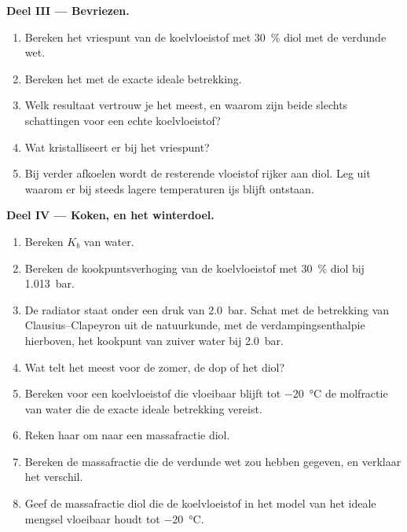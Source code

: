 \begin{problem}
\medskip
\noindent\textbf{Deel III --- Bevriezen.}
\begin{enumerate}[resume]
  \item Bereken het vriespunt van de koelvloeistof met \qty{30}{\percent} diol met de
        verdunde wet.
  \item Bereken het met de exacte ideale betrekking.
  \item Welk resultaat vertrouw je het meest, en waarom zijn beide slechts schattingen voor een
        echte koelvloeistof?
  \item Wat kristalliseert er bij het vriespunt?
  \item Bij verder afkoelen wordt de resterende vloeistof rijker aan diol. Leg uit
        waarom er bij steeds lagere temperaturen ijs blijft ontstaan.
\end{enumerate}

\medskip
\noindent\textbf{Deel IV --- Koken, en het winterdoel.}
\begin{enumerate}[resume]
  \item Bereken $K_b$ van water.
  \item Bereken de kookpuntsverhoging van de koelvloeistof met \qty{30}{\percent} diol
        bij \qty{1.013}{bar}.
  \item De radiator staat onder een druk van \qty{2.0}{bar}. Schat met de
        betrekking van Clausius--Clapeyron uit de natuurkunde, met de
        verdampingsenthalpie hierboven, het kookpunt van zuiver water bij
        \qty{2.0}{bar}.
  \item Wat telt het meest voor de zomer, de dop of het diol?
  \item Bereken voor een koelvloeistof die vloeibaar blijft tot \qty{-20}{\celsius} de
        molfractie van water die de exacte ideale betrekking vereist.
  \item Reken haar om naar een massafractie diol.
  \item Bereken de massafractie die de verdunde wet zou hebben gegeven, en
        verklaar het verschil.
  \item Geef de massafractie diol die de koelvloeistof in het model van het ideale mengsel
        vloeibaar houdt tot \qty{-20}{\celsius}.
\end{enumerate}
\end{problem}
